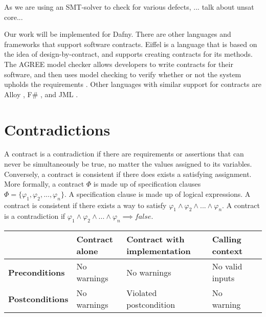 \documentclass{article}
\newif\ifcomments
\newcommand{\cass}[1]{\ifcomments\textcolor{blue}{cass: #1}\fi}
\begin{document}
As we are using an SMT-solver to check for various defects, ... talk about unsat core...
\cass{not really sure how to talk about this. Should I talk about 
just how it's possible that there are issues in SMT solvers, and so finding an unsat core shows that the SMT solver is correct? Should I mention that 
Z3 does produce a core?}

Our work will be implemented for Dafny. There are other languages and frameworks that support software contracts. Eiffel \cite{meyer1988eiffel} is a language that 
is based on the idea of design-by-contract, and supports creating contracts for its methods. The AGREE model checker allows developers to write contracts for their 
software, and then uses model checking to verify whether or not the system upholds the requirements \cite{mercer2023synthesizing}. Other languages with similar 
support for contracts are Alloy \cite{jackson2002alloy}, F\# \cite{syme2010f}, and JML \cite{leavens1998jml}. 

\section{Contradictions}

A contract is a contradiction if there are requirements or assertions that can never be simultaneously be true, no matter the values assigned 
to its variables. Conversely, a contract is consistent if there does exists a satisfying assignment. More formally, a
contract \(\Phi\) is made up of specification clauses \(\Phi = \{\varphi_{1}, \varphi_{2}, ..., \varphi_{n}\}\).
A specification clause is made up of logical expressions. A contract is consistent if there exists a way to satisfy
\(\varphi_{1} \land \varphi_{2} \land ... \land \varphi_{n} \). A contract is a contradiction
if \(\varphi_{1} \land \varphi_{2} \land ... \land \varphi_{n} \implies false\).

\begin{center}
\begin{tabularx}{0.9\textwidth} { 
  | >{\raggedright\arraybackslash}X 
  | >{\raggedright\arraybackslash}X 
  | >{\centering\arraybackslash}X 
  | >{\raggedright\arraybackslash}X 
  | >{\raggedleft\arraybackslash}X | }
     \hline
      & \textbf{Contract alone} & \textbf{Contract with implementation} & \textbf{Calling context} \\
     \hline
     \textbf{Preconditions} & No warnings  & No warnings & No valid inputs \\
     \hline
     \textbf{Postconditions}  & No warnings  & Violated postcondition & No warning \\
    \hline
\end{tabularx}
\end{center}
\end{document}
